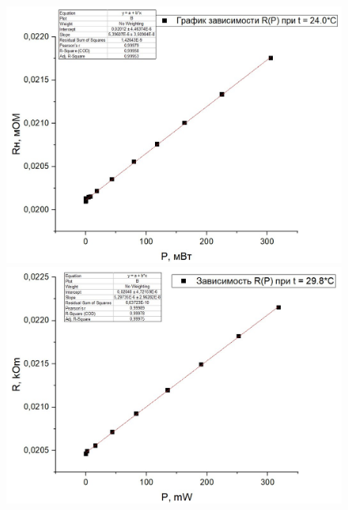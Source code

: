 \documentclass[a4paper,12pt]{article} %
\begin{document}
\begin{figure}
\begin{minipage}{\linewidth}
\centering
\includegraphics[scale=0.35]{24.0.jpg}
\caption{}
\end{minipage}
\begin{minipage}{\linewidth}
\centering
\includegraphics[scale=0.35]{29.8.jpg}
\caption{}
\end{minipage}
\end{figure}
\end{document}
